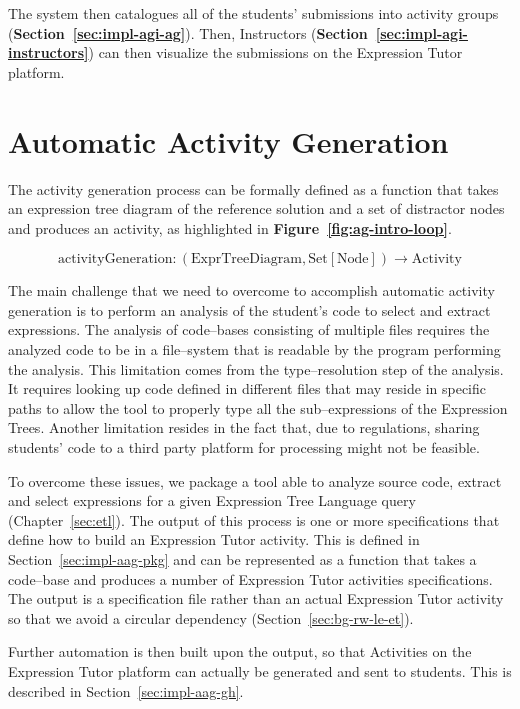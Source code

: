 \begin{chapterBody}
The system then catalogues all of the students' submissions into
activity groups \hfill\break (\textbf{Section~\ref{sec:impl-agi-ag}}).
Then, Instructors 
(\textbf{Section~\ref{sec:impl-agi-instructors}}) can then visualize the
submissions on the Expression Tutor platform.

\section{Automatic Activity Generation}\label{sec:impl-aag}

The activity generation process can be formally defined as a
function that takes an expression tree diagram of the reference
solution and a set of distractor nodes and produces an activity, as
highlighted in \textbf{Figure~\ref{fig:ag-intro-loop}}.

\[
\text{activityGeneration}:
\left(\text{ExprTreeDiagram}, \text{Set}\left[\text{Node}\right]\right)
\rightarrow
\text{Activity}
\]

The main challenge that we need to overcome to accomplish automatic
activity generation is to perform an analysis of the student's code to
select and extract expressions.
The analysis of code–bases consisting of multiple files requires the
analyzed code to be in a file–system that is readable by the program performing
the analysis. This limitation comes from the type–resolution step of the
analysis. It requires looking up code defined in different files that may
reside in specific paths to allow the tool to properly type all the
sub–expressions of the Expression Trees.
Another limitation resides in the fact that, due to regulations, sharing
students' code to a third party platform for processing might not be feasible.

To overcome these issues, we package a tool able to analyze source code,
extract and select expressions for a given Expression Tree Language query
(Chapter~\ref{sec:etl}). The output of this process is one or more specifications
that define how to build an Expression Tutor activity. This is defined in
Section~\ref{sec:impl-aag-pkg} and can be represented as a function that takes
a code–base and produces a number of Expression Tutor activities specifications.
The output is a specification file rather than an actual Expression Tutor
activity so that we avoid a circular dependency
(Section~\ref{sec:bg-rw-le-et}).

Further automation is then built upon the output, so that Activities on the
Expression Tutor platform can actually be generated and sent to students.
This is described in Section~\ref{sec:impl-aag-gh}.


\end{chapterBody}
